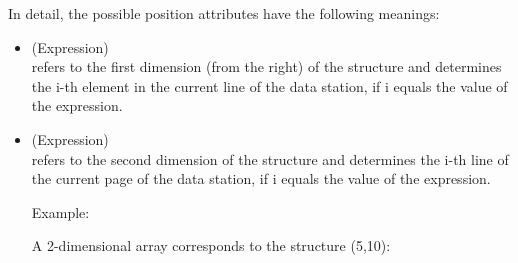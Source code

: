 In detail, the possible position attributes have the following
meanings:
\begin{itemize}
\item {} (Expression)\\
refers to the first dimension (from the right) of the structure and
determines the i-th element in the current line of the data station, if
i equals the value of the expression.
\item {} (Expression)\\
refers to the second dimension of the structure and determines the i-th
line of the current page of the data station, if i equals the value of
the expression.

Example:

A 2-dimensional array corresponds to the structure (5,10):


\end{itemize}
